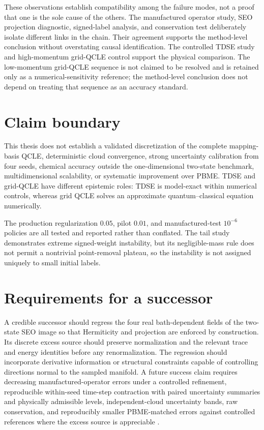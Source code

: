 These observations establish compatibility among the failure modes, not a
proof that one is the sole cause of the others. The manufactured operator
study, SEO projection diagnostic, signed-label analysis, and conservation
test deliberately isolate different links in the chain. Their agreement
supports the method-level conclusion without overstating causal identification.
The controlled TDSE study and high-momentum grid-QCLE control support the
physical comparison. The low-momentum grid-QCLE sequence is not claimed to be
resolved and is retained only as a numerical-sensitivity reference; the
method-level conclusion does not depend on treating that sequence as an
accuracy standard.

\section{Claim boundary}
\label{sec:discussion-limitations}

This thesis does not establish a validated discretization of the complete
mapping-basis QCLE, deterministic cloud convergence, strong uncertainty
calibration from four seeds, chemical accuracy outside the one-dimensional
two-state benchmark, multidimensional scalability, or systematic improvement
over PBME. TDSE and grid-QCLE have different epistemic roles: TDSE is
model-exact within numerical controls, whereas grid QCLE solves an approximate
quantum--classical equation numerically.

The production regularization \(0.05\), pilot \(0.01\), and
manufactured-test \(10^{-6}\) policies are all tested and reported rather than
conflated. The tail study demonstrates extreme signed-weight instability, but
its negligible-mass rule does not permit a nontrivial point-removal plateau,
so the instability is not assigned uniquely to small initial labels.

\section{Requirements for a successor}
\label{sec:discussion-successor}

A credible successor should regress the four real bath-dependent fields of the
two-state SEO image so that Hermiticity and projection are enforced by
construction. Its discrete excess source should preserve normalization and
the relevant trace and energy identities before any renormalization. The
regression should incorporate derivative information or structural constraints
capable of controlling directions normal to the sampled manifold. A future
success claim requires decreasing manufactured-operator errors under a
controlled refinement, reproducible within-seed time-step contraction with
paired uncertainty summaries and physically admissible levels,
independent-cloud uncertainty bands, raw conservation, and reproducibly
smaller PBME-matched errors against controlled references where the excess
source is appreciable
\cite{TraskBochevPerego2020,BonetLok1999,Monaghan2005}.

